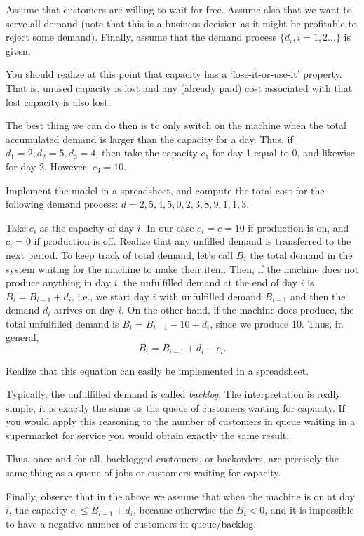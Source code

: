   \begin{solution}
    Assume that customers are willing to wait for free.  Assume also
    that we want to serve all demand (note that this is a business
    decision as it might be profitable to reject some demand). Finally,
    assume that the demand process $\{d_i, i=1,2\ldots\}$ is given.

    You should realize at this point that capacity has a
    `lose-it-or-use-it' property. That is, unused capacity is lost and any
    (already paid) cost associated with that lost capacity is also lost.

    The best thing we can do then is to only switch on the machine
    when the total accumulated demand is larger than the capacity for
    a day.  Thus, if $d_1=2, d_2 = 5, d_3 = 4$, then take the capacity
    $c_1$ for day 1 equal to 0, and likewise for day 2. However,
    $c_3 =10$. 
  \end{solution}

\begin{question}
  Implement the model in a spreadsheet, and compute the total cost for the
  following demand process: $d = 2, 5, 4, 5, 0, 2, 3, 8, 9, 1, 1, 3$.
\end{question}

\begin{solution}
  Take $c_i$ as the capacity of day $i$. In our case $c_i=c=10$ if
  production is on, and $c_i=0$ if production is off.  Realize that
  any unfilled demand is transferred to the next period. To keep track
  of total demand, let's call $B_i$ the total demand in the system
  waiting for the machine to make their item. Then, if the machine
  does not produce anything in day $i$, the unfulfilled demand at the
  end of day $i$ is $B_i=B_{i-1}+d_i$, i.e., we start day $i$ with
  unfulfilled demand $B_{i-1}$ and then the demand $d_i$ arrives on
  day $i$. On the other hand, if the machine does produce, the total
  unfulfilled demand is $B_i = B_{i-1}-10 + d_i$, since we produce
  10. Thus, in general,
  \begin{equation*}
    B_i = B_{i-1} + d_i - c_i.
  \end{equation*}

Realize that this equation can easily be implemented in
a spreadsheet.


  Typically, the unfulfilled demand is called \emph{backlog}. The
  interpretation is really simple, it is exactly the same as the queue
  of customers waiting for capacity. If you would apply this reasoning
  to the number of customers in queue waiting in a supermarket for
  service you would obtain exactly the same result.  

Thus, once and for all, backlogged customers, or backorders, are precisely the same thing as a queue of jobs or customers waiting for capacity. 


Finally, observe that in the above we assume that when the machine is
on at day $i$, the capacity $c_i \leq B_{i-1}+d_i$, because otherwise
the $B_i<0$, and it is impossible to have a negative number of
customers in queue/backlog.
\end{solution}


